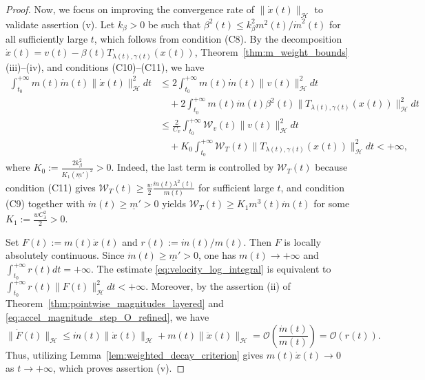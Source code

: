 \documentclass[10pt,a4paper]{amsart}
\begin{document}
\begin{proof}
Now, we focus on improving the convergence rate of $\|\dot{x}(t)\|_{\mathcal{H}}$ to validate assertion (v). Let $k_{\beta}>0$ be such that $\beta^2(t)\le k_{\beta}^2m^2(t)/\dot m^2(t)$ for all sufficiently large $t$, which follows from condition {\rm (C8)}. By the decomposition $\dot{x}(t)=v(t)-\beta(t)T_{\lambda(t),\gamma(t)}(x(t))$, Theorem~\ref{thm:m_weight_bounds}(iii)--(iv), and conditions {\rm (C10)}--{\rm (C11)}, we have
\begin{align}
\int_{t_0}^{+\infty}m(t)\dot m(t)\|\dot{x}(t)\|_{\mathcal{H}}^2dt
&\le 2\int_{t_0}^{+\infty}m(t)\dot m(t)\|v(t)\|_{\mathcal{H}}^2dt \nonumber\\
&\quad +2\int_{t_0}^{+\infty}m(t)\dot m(t)\beta^2(t)\|T_{\lambda(t),\gamma(t)}(x(t))\|_{\mathcal{H}}^2dt \nonumber\\
&\le \frac{2}{C_v}\int_{t_0}^{+\infty}\mathcal{W}_v(t)\|v(t)\|_{\mathcal{H}}^2dt \nonumber\\
&\quad +K_0\int_{t_0}^{+\infty}\mathcal{W}_T(t)\|T_{\lambda(t),\gamma(t)}(x(t))\|_{\mathcal{H}}^2dt<+\infty,
\label{eq:velocity_log_integral}
\end{align}
where $K_0:=\frac{2k_{\beta}^2}{K_1(\underline m')^2}>0$. Indeed, the last term is controlled by $\mathcal{W}_T(t)$ because condition {\rm (C11)} gives $\mathcal{W}_T(t)\ge \frac{w}{2}\frac{\dot m(t)\lambda^2(t)}{m(t)}$ for sufficient large $t$, and condition {\rm (C9)} together with $\dot m(t)\ge\underline m'>0$ yields $\mathcal{W}_T(t)\ge K_1m^3(t)\dot m(t)$ for some  $K_1:=\frac{wC_\lambda^2}{2}>0$.

Set $F(t):=m(t)\dot{x}(t)$ and $r(t):=\dot m(t)/m(t)$. Then $F$ is locally absolutely continuous. Since $\dot m(t)\ge\underline m'>0$, one has $m(t)\to+\infty$ and $\int_{t_0}^{+\infty}r(t)dt=+\infty$. The estimate \eqref{eq:velocity_log_integral} is equivalent to $\int_{t_0}^{+\infty}r(t)\|F(t)\|_{\mathcal{H}}^2dt<+\infty$.
Moreover, by the assertion {\rm (ii)} of Theorem~\ref{thm:pointwise_magnitudes_layered} and \eqref{eq:accel_magnitude_step_O_refined}, we have
\[
\|\dot F(t)\|_{\mathcal{H}}
\le \dot m(t)\|\dot x(t)\|_{\mathcal{H}}+m(t)\|\ddot x(t)\|_{\mathcal{H}}
=\mathcal{O}\left(\frac{\dot m(t)}{m(t)}\right)
=\mathcal{O}(r(t)).
\]
Thus, utilizing Lemma~\ref{lem:weighted_decay_criterion} gives $m(t)\dot{x}(t)\to0$ as $t \to +\infty$, which proves assertion (v).


\end{proof}
\end{document}
